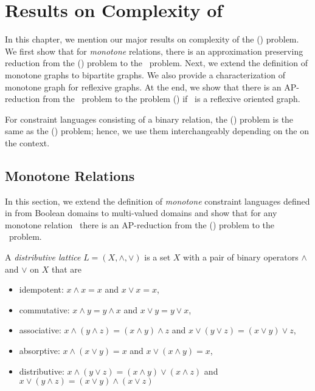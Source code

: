 \chapter{Results on Complexity of \cbis} \label{chp:results}
In this chapter, we mention our major results on complexity 
of the \ccsp(\mrelset) problem. We first show that for \emph{monotone} relations, there is an
approximation preserving reduction from the \ccsp(\mrelset) problem to the \cbis\ problem.
Next, we extend the definition of monotone graphs to bipartite graphs. We also provide a characterization of monotone graph for reflexive graphs.
At the end, we show that there is an AP-reduction from the \cbis\ problem 
to the problem \chom(\mH) if \mH\ is a reflexive oriented graph.

For constraint languages consisting of a binary relation, the \ccsp(\mrelset) problem is
the same as the \chom(\mH) problem; hence, we use them interchangeably depending on the on the context.

\section{Monotone Relations}
In this section, we extend the definition of \emph{monotone} constraint languages defined in
\cite{Trichotomy} from Boolean domains to multi-valued domains and show that for
any monotone relation \mrelset\ there is an AP-reduction from the \ccsp(\mrelset) problem to
the \cbis\ problem.

\begin{defi} 
A \emph{distributive lattice} \(L=(X,\wedge,\vee)\) is a set \(X\) with a pair of binary operators \(\wedge\)
and \(\vee\) on \(X\) that are 
\begin{itemize}
\item idempotent: \(x \wedge x = x\) and \(x \vee x = x\),
\item commutative: \(x \wedge y = y \wedge x\) and \(x \vee y = y \vee x\),
\item associative: \(x \wedge (y \wedge z) = (x \wedge y) \wedge z\) and 
\(x \vee (y \vee z) = (x \vee y) \vee z\),
\item absorptive: \(x \wedge (x\vee y) = x\) and \(x \vee (x \wedge y) = x\),
\item distributive: \(x \wedge (y \vee z) = (x \wedge y) \vee (x \wedge z)\) and
\(x \vee (y \wedge z) = (x \vee y) \wedge (x \vee z)\)
\end{itemize}
\end{defi}

